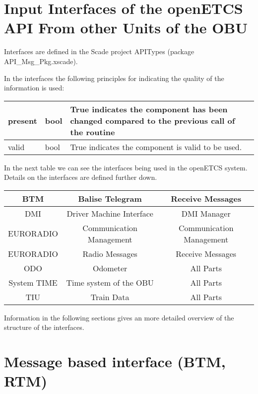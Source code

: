 \section{Input Interfaces of the openETCS API From other Units of the OBU}
Interfaces are defined in the Scade project APITypes (package API\_Msg\_Pkg.xscade).

In the interfaces the following principles for indicating the quality of the information is used:


\begin{supertabular}{| p{2 cm} | p{2 cm} | p{8 cm} |}
present & bool & True indicates the component has been changed compared to the previous call of the routine
\\\hline 
valid & bool & True indicates the component is valid to be used. 
\\\hline 
\end{supertabular}

In the next table we can see the interfaces being used in the openETCS system. Details on the interfaces are defined further down.

\begin{supertabular}{| c | c | c |}
{BTM} & Balise Telegram & Receive Messages  \\\hline
{DMI} & Driver Machine Interface & DMI Manager  \\\hline
EURORADIO & Communication Management & Communication Management  \\\hline
EURORADIO & Radio Messages & Receive Messages  \\\hline
{ODO} & Odometer & All Parts \\\hline
System TIME & Time system of the OBU & All Parts \\\hline
TIU & Train Data & All Parts \\\hline
\end{supertabular}

Information in the following sections gives an more detailed overview of the structure of the interfaces.


\section{Message based interface (BTM, RTM)}


